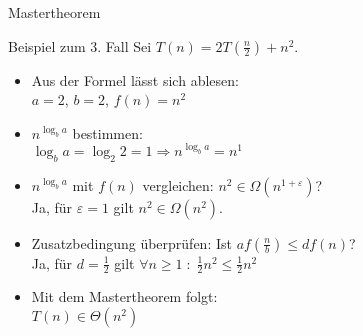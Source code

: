 \begin{frame}{Mastertheorem}
    \begin{exampleblock}{Beispiel zum 3. Fall}
    	Sei $T(n) = 2 T \left(\frac{n}{2} \right) + n^2$.
    	\begin{itemize}
    		\item Aus der Formel lässt sich ablesen:\\
    			$a=2$, $b=2$, $f(n)=n^2$
    		\item $n^{\log_b a}$ bestimmen:\\
    			$\log_b a = \log_2 2 = 1 \Rightarrow n^{\log_b a} = n^1$
    		\item $n^{\log_b a}$ mit $f(n)$ vergleichen: $n^2 \in \Omega(n^{1+\varepsilon})$?\\
    			Ja, für $\varepsilon = 1$ gilt $n^2 \in \Omega(n^2)$.
    		\item Zusatzbedingung überprüfen: Ist $af\left(\frac{n}{b}\right)\leq d f(n)$?\\
    			Ja, für $d = \frac{1}{2}$ gilt $\forall n \geq 1 \; : \; \frac{1}{2}n^2 \leq \frac{1}{2}n^2$
    		\item Mit dem Mastertheorem folgt:\\
    			$T(n) \in \Theta(n^2)$
    	\end{itemize}
    \end{exampleblock}
\end{frame}